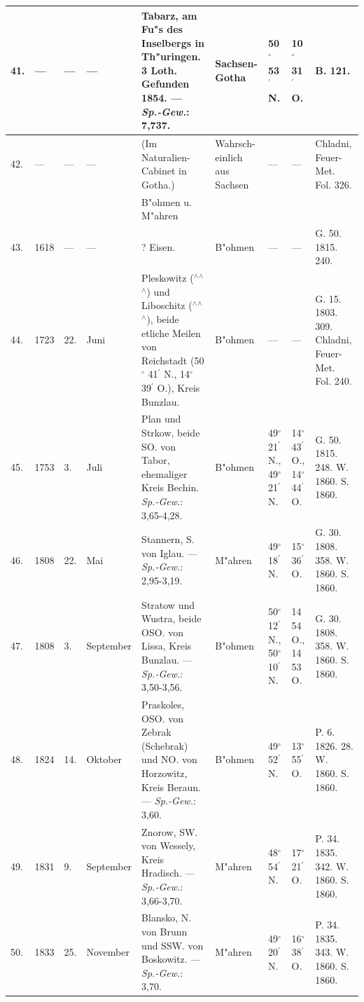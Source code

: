 \documentclass[a4paper, 8pt, oneside, polutonikogreek, german]{article}
\begin{document}
\begin{center}
\begin{longtable}{|p{3mm}|p{13mm}|p{5mm}|p{16mm}|p{25mm}|p{13mm}|p{13mm}|p{13mm}|p{13mm}|}
        41. & --- & --- & --- & Tabarz, am Fu"s des Inselbergs in Th"uringen. 3 Loth. Gefunden 1854. --- \emph{Sp.-Gew.}: 7,737. & Sachsen-Gotha & 50$^\circ$ 53$^\prime$ N. & 10$^\circ$ 31$^\prime$ O. & B. 121. \\ \hline
        42. & --- & --- & --- & (Im Naturalien-Cabinet in Gotha.) & Wahrsch- einlich aus Sachsen & --- & --- & Chladni, Feuer-Met. Fol. 326. \\ \hline
         &   &   &   & B"ohmen u. M"ahren  &   &   &   &   \\ \hline
        43. & 1618 & --- & --- & ? Eisen. & B"ohmen & --- & --- & G. 50. 1815. 240. \\ \hline
        44. & 1723 & 22. & Juni & Pleskowitz ($^\wedge$$^\wedge$$^\wedge$) und Liboschitz ($^\wedge$$^\wedge$$^\wedge$), beide etliche Meilen von Reichstadt (50$^\circ$ 41$^\prime$ N., 14$^\circ$ 39$^\prime$ O.), Kreis Bunzlau. & B"ohmen & --- & --- & G. 15. 1803. 309. Chladni, Feuer-Met. Fol. 240. \\ \hline
        45. & 1753 & 3. & Juli & Plan und Strkow, beide SO. von Tabor, ehemaliger Kreis Bechin. \emph{Sp.-Gew.}: 3,65-4,28. & B"ohmen & 49$^\circ$ 21$^\prime$ N., 49$^\circ$ 21$^\prime$ N. & 14$^\circ$ 43$^\prime$ O., 14$^\circ$ 44$^\prime$ O. & G. 50. 1815. 248. W. 1860. S. 1860. \\ \hline
        46. & 1808 & 22. & Mai & Stannern, S. von Iglau. --- \emph{Sp.-Gew.}: 2,95-3,19. & M"ahren & 49$^\circ$ 18$^\prime$ N. & 15$^\circ$ 36$^\prime$ O. & G. 30. 1808. 358. W. 1860. S. 1860. \\ \hline
        47. & 1808 & 3. & September & Stratow und Wustra, beide OSO. von Lissa, Kreis Bunzlau. --- \emph{Sp.-Gew.}: 3,50-3,56. & B"ohmen & 50$^\circ$ 12$^\prime$ N., 50$^\circ$ 10$^\prime$ N. & 14 54 O., 14 53 O. & G. 30. 1808. 358. W. 1860. S. 1860. \\ \hline
        48. & 1824 & 14. & Oktober & Praskoles, OSO. von Zebrak (Schebrak) und NO. von Horzowitz, Kreis Beraun. --- \emph{Sp.-Gew.}: 3,60. & B"ohmen & 49$^\circ$ 52$^\prime$ N. & 13$^\circ$ 55$^\prime$ O. & P. 6. 1826. 28. W. 1860. S. 1860. \\ \hline
        49. & 1831 & 9. & September & Znorow, SW. von Wessely, Kreis Hradisch. --- \emph{Sp.-Gew.}: 3,66-3,70. & M"ahren & 48$^\circ$ 54$^\prime$ N. & 17$^\circ$ 21$^\prime$ O. & P. 34. 1835. 342. W. 1860. S. 1860. \\ \hline
        50. & 1833 & 25. & November & Blansko, N. von Brunn und SSW. von Boskowitz. --- \emph{Sp.-Gew.}: 3,70. & M"ahren & 49$^\circ$ 20$^\prime$ N. & 16$^\circ$ 38$^\prime$ O. & P. 34. 1835. 343. W. 1860. S. 1860. \\ \hline

\end{longtable}
\end{center}
\end{document}
